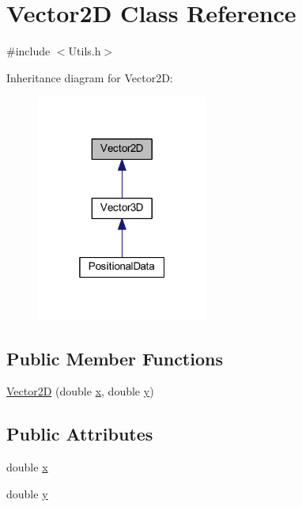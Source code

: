\hypertarget{class_vector2_d}{}\section{Vector2D Class Reference}
\label{class_vector2_d}


{\ttfamily \#include $<$Utils.\+h$>$}



Inheritance diagram for Vector2D\+:
\nopagebreak
\begin{figure}[H]
\begin{center}
\leavevmode
\includegraphics[width=160pt]{class_vector2_d__inherit__graph}
\end{center}
\end{figure}
\subsection*{Public Member Functions}
\begin{DoxyCompactItemize}
\item 
\hyperlink{class_vector2_d_a525e125aac4c844f04c52ddb0e75d594}{Vector2D} (double \hyperlink{class_vector2_d_ac5c4e553815737aa24bec8281270178f}{x}, double \hyperlink{class_vector2_d_ac38d0179cfe74c30fee290a703ab209a}{y})
\end{DoxyCompactItemize}
\subsection*{Public Attributes}
\begin{DoxyCompactItemize}
\item 
double \hyperlink{class_vector2_d_ac5c4e553815737aa24bec8281270178f}{x}
\item 
double \hyperlink{class_vector2_d_ac38d0179cfe74c30fee290a703ab209a}{y}
\end{DoxyCompactItemize}


